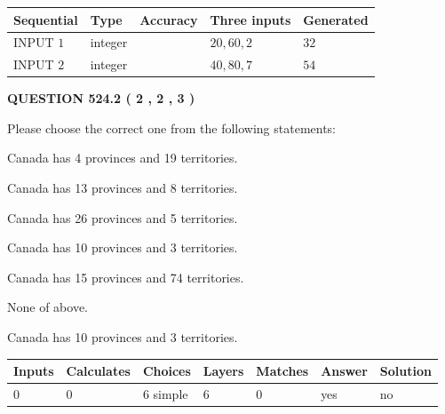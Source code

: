 \documentclass[12pt]{article}
\begin{document}
   
  
  
\noindent\begin{tabular}{|l|l|l|l|l|}
\hline
 Sequential & Type & Accuracy & Three inputs & Generated \\ 
\hline
 
 
  INPUT $  1 $ & integer &  & $
 20
 , 
 60
 , 
 2
 $ & $ 32 $ 
 \\  \hline  
 
 
  INPUT $  2 $ & integer &  & $
 40
 , 
 80
 , 
 7
 $ & $ 54 $ 
 \\  \hline  
 \end{tabular}
   
   
  
\vspace{0.2in}
  
{\textbf{\Large{QUESTION
524.2 
 ( 2 , 2 , 3 )
}}}
  
  
Please choose the correct one from the following statements:
 
 
Canada has   4 provinces and  19 territories.
 
 
Canada has  13 provinces and  8 territories.
 
 
Canada has  26 provinces and  5 territories.
 
 
Canada has 10  provinces and 3 territories.
 
 
Canada has  15 provinces and  74 territories.
 
 
 None of above.
 
 
\noindent{}
 
 
Canada has 10  provinces and 3 territories.
 
 
\noindent{}
 
 
   
   
   
   
\noindent\begin{tabular}{|l|l|l|l|l|l|l|}
 \hline
Inputs & Calculates & Choices & Layers & Matches & Answer & Solution \\ \hline
 0  & 
 0  & 
 6
  simple  
  & 
 6  & 
 0  & 
  yes & 
  no 
  \\ \hline
 \end{tabular}
   
\end{document}
